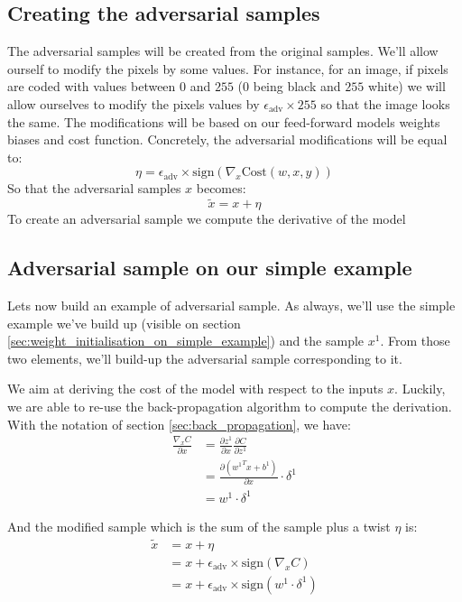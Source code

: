 		

	\subsection{Creating the adversarial samples}
	\label{sec:creating_the_adversarial_samples}
		The adversarial samples will be created from the original samples. We'll allow ourself to modify the pixels by some values. For instance, for an image, if pixels are coded with values between $0$ and $255$ ($0$ being black and $255$ white) we will allow ourselves to modify the pixels values by $\epsilon_{\text{adv}} \times 255$ so that the image looks the same. The modifications will be based on our feed-forward models weights biases and cost function. Concretely, the adversarial modifications will be equal to:
		$$ \eta = \epsilon_{\text{adv}} \times \text{sign}(\nabla_x \text{Cost}(w,x,y)) $$
		So that the adversarial samples $x$ becomes:
		$$ \tilde{x} = x + \eta $$
		To create an adversarial sample we compute the derivative of the model 


	\subsection{Adversarial sample on our simple example}
	\label{sub:adversarial_sample_on_the_simple_example}
		Lets now build an example of adversarial sample. As always, we'll use the simple example we've build up (visible on section \ref{sec:weight_initialisation_on_simple_example}) and the sample $x^1$. From those two elements, we'll build-up the adversarial sample corresponding to it.

		We aim at deriving the cost of the model with respect to the inputs $x$. Luckily, we are able to re-use the back-propagation algorithm to compute the derivation. With the notation of section \ref{sec:back_propagation}, we have:
		\begin{equation}
			\begin{split}
				\frac{\nabla_x C}{\partial x } 
				&= \frac{\partial z^1}{\partial x} \frac{\partial C}{\partial z^1 } \\
				&= \frac{\partial \left({w^1}^Tx+b^1 \right)}{\partial x} \cdot \delta^1 \\
				&= w^1 \cdot \delta^1
			\end{split}
		\end{equation}

		And the modified sample which is the sum of the sample plus a twist $\eta$ is:
		\begin{equation}
			\begin{split}
				\tilde{x}
				&= x + \eta \\
				&= x + \epsilon_{\text{adv}} \times \text{sign}(\nabla_x C) \\
				&= x + \epsilon_{\text{adv}} \times \text{sign}( w^1 \cdot \delta^1 )
			\end{split}
			\label{eq:sample_twist}
		\end{equation}

